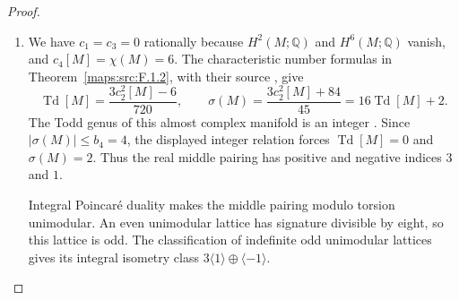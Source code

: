 \begin{proof}
\begin{enumerate}[label=\arabic*.]
Over the two-dimensional pair of pants the prescribed boundary
sections of the associated $\mathcal J$-bundle extend over relative
one-cells by connectedness and over relative two-cells by simple
connectivity. Smooth approximation relative to the collars gives
a smooth vertical structure. Horizontal splittings form an affine
space, so a partition of unity extends the prescribed complex
splittings from those collars. Combining the vertical structure with
the pulled-back base structure and gluing the caps gives the required
almost complex structure on $M$.

\item We have $c_1=c_3=0$ rationally because $H^2(M;\mathbb Q)$ and
$H^6(M;\mathbb Q)$ vanish, and $c_4[M]=\chi(M)=6$. The characteristic
number formulas in Theorem~\ref{maps:src:F.1.2}, with their source
\cite[equations (1.2)--(1.4), pp.~3--4]{ffEsoleKang}, give
\[
 \operatorname{Td}[M]=\frac{3c_2^2[M]-6}{720},
 \qquad
 \sigma(M)=\frac{3c_2^2[M]+84}{45}
           =16\operatorname{Td}[M]+2.
\]
The Todd genus of this almost complex manifold is an integer
\cite[Theorem 24.5.4 and corollary, p.~184]{HirzebruchTopologicalMethods}.
Since $|\sigma(M)|\leq b_4=4$, the displayed integer relation forces
$\operatorname{Td}[M]=0$ and $\sigma(M)=2$. Thus the real middle
pairing has positive and negative indices $3$ and $1$.

Integral Poincar\'e duality makes the middle pairing modulo torsion
unimodular. An even unimodular lattice has signature divisible by
eight, so this lattice is odd. The classification of indefinite odd
unimodular lattices
\cite[Theorem 2.2.1, p.~61]{ffPetersSterk} gives its integral isometry
class $3\langle1\rangle\oplus\langle-1\rangle$.
\end{enumerate}
\end{proof}
